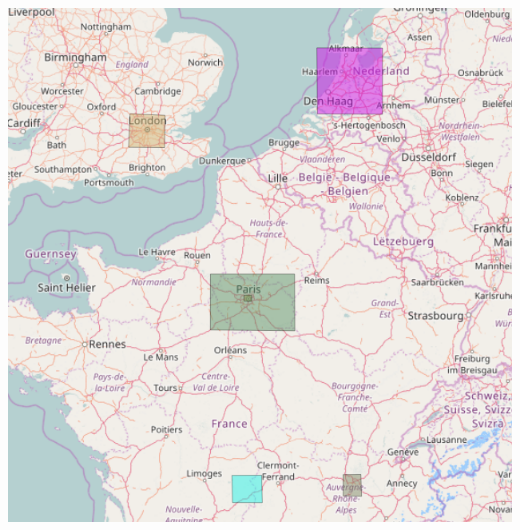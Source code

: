 \documentclass[english,11pt]{beamer}
\begin{document}
{\begin{columns}
\centering
\includegraphics[width=\textwidth]{figures/nwanal_areas.png}

\end{columns}
}
\end{document}
